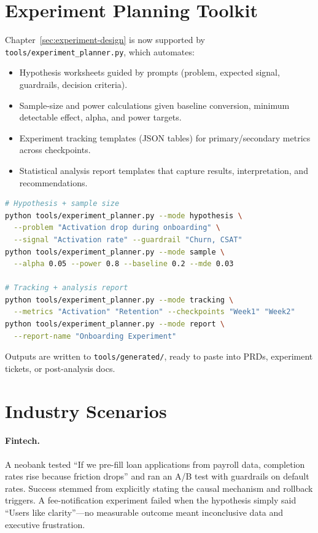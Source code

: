 \section{Experiment Planning Toolkit}
\label{sec:hypothesis-tooling}

Chapter~\ref{sec:experiment-design} is now supported by \texttt{tools/experiment\_planner.py}, which automates:
\begin{itemize}
    \item Hypothesis worksheets guided by prompts (problem, expected signal, guardrails, decision criteria).
    \item Sample-size and power calculations given baseline conversion, minimum detectable effect, alpha, and power targets.
    \item Experiment tracking templates (JSON tables) for primary/secondary metrics across checkpoints.
    \item Statistical analysis report templates that capture results, interpretation, and recommendations.
\end{itemize}

\begin{lstlisting}[language=bash,caption={Using the experiment planning CLI (examples verified with Python 3.13 and the tools bundled in this repo).}]
# Hypothesis + sample size
python tools/experiment_planner.py --mode hypothesis \
  --problem "Activation drop during onboarding" \
  --signal "Activation rate" --guardrail "Churn, CSAT"
python tools/experiment_planner.py --mode sample \
  --alpha 0.05 --power 0.8 --baseline 0.2 --mde 0.03

# Tracking + analysis report
python tools/experiment_planner.py --mode tracking \
  --metrics "Activation" "Retention" --checkpoints "Week1" "Week2"
python tools/experiment_planner.py --mode report \
  --report-name "Onboarding Experiment"
\end{lstlisting}

Outputs are written to \texttt{tools/generated/}, ready to paste into PRDs, experiment tickets, or post-analysis docs.

\section{Industry Scenarios}
\label{sec:hypotheses-examples}

\paragraph{Fintech.} A neobank tested ``If we pre-fill loan applications from payroll data, completion rates rise because friction drops'' and ran an A/B test with guardrails on default rates. Success stemmed from explicitly stating the causal mechanism and rollback triggers. A fee-notification experiment failed when the hypothesis simply said ``Users like clarity''—no measurable outcome meant inconclusive data and executive frustration.

